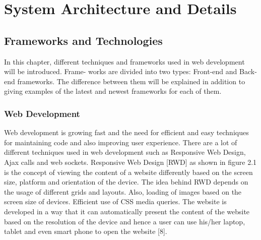 \chapter{System Architecture and Details}
\label{ChapterFive}
\section{Frameworks and Technologies}
\label{FrameworksAndTechnologies}
In this chapter, different techniques and frameworks used in web development will be introduced. Frame- works are divided into two types: Front-end and Back-end frameworks. The difference between them will be explained in addition to giving examples of the latest and newest frameworks for each of them.
\subsection{Web Development}
Web development is growing fast and the need for efficient and easy techniques for maintaining code and also improving user experience. There are a lot of different techniques used in web development such as Responsive Web Design, Ajax calls and web sockets.
Responsive Web Design [RWD] as shown in figure 2.1 is the concept of viewing the content of a website differently based on the screen size, platform and orientation of the device. The idea behind RWD depends on the usage of different grids and layouts. Also, loading of images based on the screen size of devices. Efficient use of CSS media queries. The website is developed in a way that it can automatically present the content of the website based on the resolution of the device and hence a user can use his/her laptop, tablet and even smart phone to open the website [8].
